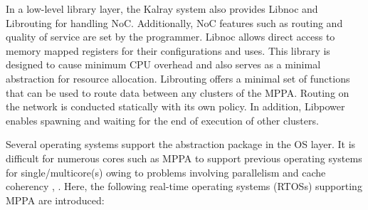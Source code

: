   In a low-level library layer, the Kalray system also provides Libnoc and Librouting for handling NoC.
  Additionally, NoC features such as routing and quality of service are set by the programmer.
  Libnoc allows direct access to memory mapped registers for their configurations and uses.
  This library is designed to cause minimum CPU overhead and also serves as a minimal abstraction for resource allocation.
  Librouting offers a minimal set of functions that can be used to route data between any clusters of the MPPA.
  Routing on the network is conducted statically with its own policy.
  In addition, Libpower enables spawning and waiting for the end of execution of other clusters.
  
  
  Several operating systems support the abstraction package in the OS layer.
  It is difficult for numerous cores such as MPPA to support previous operating systems for single/multicore(s) owing to problems involving parallelism and cache coherency \cite{Wentzlaff2009FOS}, \cite{schupbach2008embracing}.
  Here, the following real-time operating systems (RTOSs) supporting MPPA are introduced:

